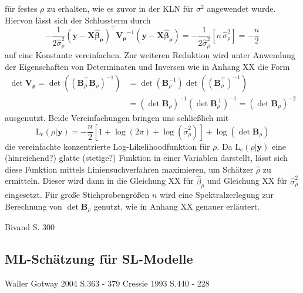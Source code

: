 für festes $\rho$ zu erhalten, wie es zuvor in der KLN für $\sigma^2$ angewendet wurde. Hiervon lässt sich der Schlussterm durch
\begin{equation*}
    -\frac{1}{2 \hat{\sigma}_{\rho}^{2}} \left( \mathbf{y-X \hat{\beta}_{\rho}} \right)^{\top} \mathbf{V_{\rho}}^{-1} \left( \mathbf{y-X \hat{\beta}_{\rho}} \right)
    = -\frac{1}{2 \hat{\sigma}_{\rho}^{2}} \left[ n \, \hat{\sigma}_{\rho}^{2} \right] = -\frac{n}{2}
\end{equation*}
auf eine Konstante vereinfachen. Zur weiteren Reduktion wird unter Anwendung der Eigenschaften 
von Determinaten und Inversen wie in Anhang XX die Form
\begin{align*}
    \det \mathbf{V_{\rho}} = \det \left(  \left(\mathbf{B}_{\rho}^{\top} \mathbf{B}_{\rho} \right)^{-1} \right) 
    & = \det \left(\mathbf{B}_{\rho}^{-1} \right)  \det \left(\left( \mathbf{B}_{\rho}^{\top} \right)^{-1} \right) \\
    & = \left( \det \mathbf{B}_{\rho} \right)^{-1}  \left( \det \mathbf{B}_{\rho}^{\top} \right)^{-1} 
    = \left( \det \mathbf{B}_{\rho} \right)^{-2}
\end{align*}
ausgenutzt. Beide Vereinfachungen bringen uns schließlich mit
\begin{equation*}
    \operatorname{L_{c}}(\rho|\mathbf{y})= -\frac{n}{2} \left[ 1+ \log(2\pi)+ \log(\hat{\sigma}_{\rho}^{2}) \right] 
    + \log(\det \mathbf{B}_{\rho} )
\end{equation*}
die vereinfachte konzentrierte Log-Likelihoodfunktion für $\rho$. Da $\operatorname{L_{c}}(\rho|\mathbf{y})$ eine 
(hinreichend?) glatte (stetige?) Funktion in einer Variablen darstellt, lässt sich diese Funktion 
mittels Liniensuchverfahren maximieren, um Schätzer $\hat{\rho}$ zu ermitteln. Dieser wird dann in die 
Gleichung XX für $\hat{\beta}_{\rho}$ und Gleichung XX für $\hat{\sigma}_{\rho}^{2}$ eingesetzt. Für 
große Stichprobengrößen $n$ wird eine Spektralzerlegung zur Berechnung von $\det \mathbf{B}_{\rho}$ genutzt, 
wie in Anhang XX genauer erläutert. 

Bivand S. 300

\subsection{ML-Schätzung für SL-Modelle}

Waller Gotway 2004 S.363  - 379
Cressie 1993 S.440    -  228

 
